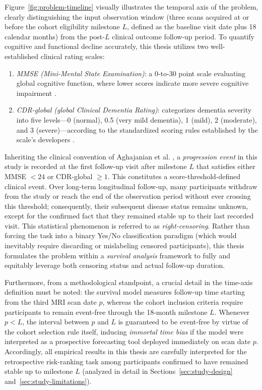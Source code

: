 Figure~\ref{fig:problem-timeline} visually illustrates the temporal axis of the problem, clearly distinguishing the input observation window (three scans acquired at or before the cohort eligibility milestone $L$, defined as the baseline visit date plus 18 calendar months) from the post-$L$ clinical outcome follow-up period. To quantify cognitive and functional decline accurately, this thesis utilizes two well-established clinical rating scales:
\begin{enumerate}
\item \emph{MMSE (Mini-Mental State Examination)}: a 0-to-30 point scale evaluating global cognitive function, where lower scores indicate more severe cognitive impairment \cite{folstein1975mmse}.
\item \emph{CDR-global (global Clinical Dementia Rating)}: categorizes dementia severity into five levels---0 (normal), 0.5 (very mild dementia), 1 (mild), 2 (moderate), and 3 (severe)---according to the standardized scoring rules established by the scale's developers \cite{morris1993cdr,knightcdrscoring}.
\end{enumerate}

Inheriting the clinical convention of Aghajanian et al. \cite{aghajanian2025longitudinal}, a \emph{progression event} in this study is recorded at the first follow-up visit after milestone $L$ that satisfies either MMSE $<24$ or CDR-global $\geq1$. This constitutes a score-threshold-defined clinical event. Over long-term longitudinal follow-up, many participants withdraw from the study or reach the end of the observation period without ever crossing this threshold; consequently, their subsequent disease status remains unknown, except for the confirmed fact that they remained stable up to their last recorded visit. This statistical phenomenon is referred to as \emph{right-censoring}. Rather than forcing the task into a binary Yes/No classification paradigm (which would inevitably require discarding or mislabeling censored participants), this thesis formulates the problem within a \emph{survival analysis} framework to fully and equitably leverage both censoring status and actual follow-up duration.

Furthermore, from a methodological standpoint, a crucial detail in the time-axis definition must be noted: the survival model measures follow-up time starting from the third MRI scan date $p$, whereas the cohort inclusion criteria require participants to remain event-free through the 18-month milestone $L$. Whenever $p<L$, the interval between $p$ and $L$ is guaranteed to be event-free by virtue of the cohort selection rule itself, inducing \emph{immortal time bias} \cite{suissa2008immortal} if the model were interpreted as a prospective forecasting tool deployed immediately on scan date $p$. Accordingly, all empirical results in this thesis are carefully interpreted for the retrospective risk-ranking task among participants confirmed to have remained stable up to milestone $L$ (analyzed in detail in Sections~\ref{sec:study-design} and~\ref{sec:study-limitations}).

